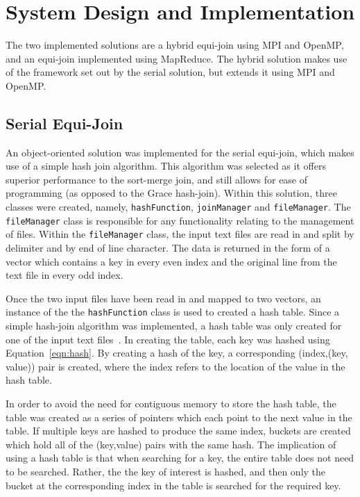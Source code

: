 \documentclass[10pt,twocolumn]{witseiepaper}
\begin{document}
\section{System Design and Implementation}
The two implemented solutions are a hybrid equi-join using MPI and OpenMP, and an equi-join implemented using MapReduce. The hybrid solution makes use of the framework set out by the serial solution, but extends it using MPI and OpenMP.

\subsection{Serial Equi-Join}
An object-oriented solution was implemented for the serial equi-join, which makes use of a simple hash join algorithm. This algorithm was selected as it offers superior performance to the sort-merge join, and still allows for ease of programming (as opposed to the Grace hash-join). Within this solution, three classes were created, namely, \texttt{hashFunction}, \texttt{joinManager} and \texttt{fileManager}. The \texttt{fileManager} class is responsible for any functionality relating to the management of files. Within the \texttt{fileManager} class, the input text files are read in and split by delimiter and by end of line character. The data is returned in the form of a vector which contains a key in every even index and the original line from the text file in every odd index.

Once the two input files have been read in and mapped to two vectors, an instance of the the \texttt{hashFunction} class is used to created a hash table. Since a simple hash-join algorithm was implemented, a hash table was only created for one of the input text files~\cite{evaluating4JoinAlgorithms}. In creating the table, each key was hashed using Equation~\ref{eqn:hash}. By creating a hash of the key, a corresponding (index,(key, value)) pair is created, where the index refers to the location of the value in the hash table. 

In order to avoid the need for contiguous memory to store the hash table, the table was created as a series of pointers which each point to the next value in the table. If multiple keys are hashed to produce the same index, buckets are created which hold all of the (key,value) pairs with the same hash. The implication of using a hash table is that when searching for a key, the entire table does not need to be searched. Rather, the the key of interest is hashed, and then only the bucket at the corresponding index in the table is searched for the required key.
\end{document}

